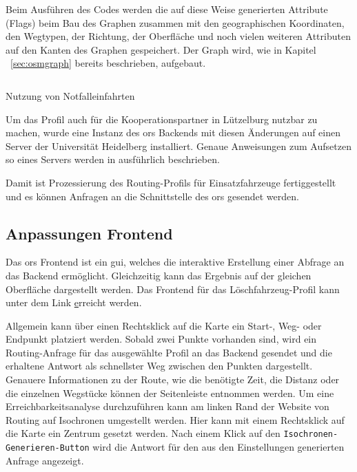 Beim Ausführen des Codes werden die auf diese Weise generierten Attribute (Flags) beim Bau des Graphen zusammen mit den geographischen Koordinaten, den Wegtypen, der Richtung, der Oberfläche und noch vielen weiteren Attributen auf den Kanten des Graphen gespeichert.
Der Graph wird, wie in Kapitel ~\ref{sec:osmgraph} bereits beschrieben, aufgebaut.

\begin{listing}[htb]
\centering
{}
\inputminted[gobble=1, fontsize=\footnotesize, breaklines=true, breakbytoken=|, firstline=562, lastline=567]{java}{../data/JavaFiles/EmergencyFlagEncoder.java}
\caption{Nutzung von Notfalleinfahrten}
\label{lst:weight}
\end{listing}

Um das Profil auch für die Kooperationspartner in Lützelburg nutzbar zu machen, wurde eine Instanz des \gls{ors} Backends mit diesen Änderungen auf einen Server der Universität Heidelberg installiert.
Genaue Anweisungen zum Aufsetzen so eines Servers werden in \cite{neisdoktor} ausführlich beschrieben.

Damit ist Prozessierung des Routing-Profils für Einsatzfahrzeuge fertiggestellt und es können Anfragen an die Schnittstelle des \gls{ors} gesendet werden.


\subsection{Anpassungen Frontend}

Das \gls{ors} Frontend ist ein \gls{gui}, welches die interaktive Erstellung einer Abfrage an das Backend ermöglicht.
Gleichzeitig kann das Ergebnis auf der gleichen Oberfläche dargestellt werden.
Das Frontend für das Löschfahrzeug-Profil kann unter dem Link \href{emergency.openrouteservice.org} erreicht werden.

\bigskip

Allgemein kann über einen Rechtsklick auf die Karte ein Start-, Weg- oder Endpunkt platziert werden.
Sobald zwei Punkte vorhanden sind, wird ein Routing-Anfrage für das ausgewählte Profil an das Backend gesendet und die erhaltene Antwort als schnellster Weg zwischen den Punkten dargestellt.
Genauere Informationen zu der Route, wie die benötigte Zeit, die Distanz oder die einzelnen Wegstücke können der Seitenleiste entnommen werden.
Um eine Erreichbarkeitsanalyse durchzuführen kann am linken Rand der Website von Routing auf Isochronen umgestellt werden.
Hier kann mit einem Rechtsklick auf die Karte ein Zentrum gesetzt werden.
Nach einem Klick auf den \texttt{Isochronen-Generieren-Button} wird die Antwort für den aus den Einstellungen generierten Anfrage angezeigt.

